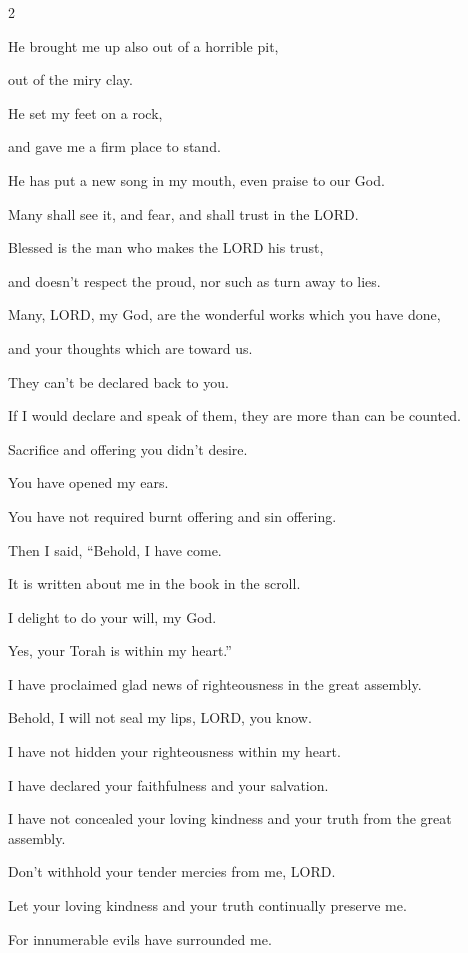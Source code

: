 \begin{multicols}{2}
	
	\myverse{}He brought me up also out of a horrible pit,
	
	out of the miry clay.
	
	He set my feet on a rock,
	
	and gave me a firm place to stand.
	
	
	\myverse{}He has put a new song in my mouth, even praise to our God.
	
	Many shall see it, and fear, and shall trust in the LORD.
	
	
	\myverse{}Blessed is the man who makes the LORD his trust,
	
	and doesn’t respect the proud, nor such as turn away to lies.
	
	
	\myverse{}Many, LORD, my God, are the wonderful works which you have done,
	
	and your thoughts which are toward us.
	
	They can’t be declared back to you.
	
	If I would declare and speak of them, they are more than can be counted.
	
	
	\myverse{}Sacrifice and offering you didn’t desire.
	
	You have opened my ears.
	
	You have not required burnt offering and sin offering.
	
	
	\myverse{}Then I said, “Behold, I have come.
	
	It is written about me in the book in the scroll.
	
	
	\myverse{}I delight to do your will, my God.
	
	Yes, your Torah is within my heart.”
	
	
	\myverse{}I have proclaimed glad news of righteousness in the great assembly.
	
	Behold, I will not seal my lips, LORD, you know.
	
	
	\myverse{}I have not hidden your righteousness within my heart.
	
	I have declared your faithfulness and your salvation.
	
	I have not concealed your loving kindness and your truth from the great assembly.
	
	
	\myverse{}Don’t withhold your tender mercies from me, LORD.
	
	Let your loving kindness and your truth continually preserve me.
	
	
	\myverse{}For innumerable evils have surrounded me.
	

\end{multicols}
